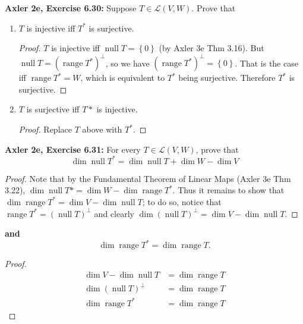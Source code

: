\documentclass{article}
\newcommand{\set}[1]{\left\{ #1 \right\}}
\DeclareMathOperator{\range}{range}
\DeclareMathOperator{\nulle}{null}
\begin{document}
\newpage %


\textbf{Axler 2e, Exercise 6.30: } %
Suppose $T \in \mathcal{L}(V, W)$. Prove that

\begin{enumerate}
    \item 
    $T$ is injective iff $T^*$ is surjective.
    \begin{proof}
        $T$ is injective iff $\nulle T = \set{0}$ (by Axler 3e Thm 3.16). But $\nulle T = (\range T^*)^\perp$, so we have $(\range T^*)^\perp = \set{0}$. That is the case iff $\range T^* = W$, which is equivalent to $T^*$ being surjective.
        Therefore $T^*$ is surjective.
    \end{proof}


    \item 
    $T$ is surjective iff $T*$ is injective.
    \begin{proof}
        Replace $T$ above with $T^*$.        
    \end{proof}
\end{enumerate}


\newpage %


\textbf{Axler 2e, Exercise 6.31: }
For every $T \in \mathcal{L}(V, W)$, prove that
$$\dim \nulle T^* = \dim \nulle T + \dim W - \dim V$$
\begin{proof}
    Note that by the Fundamental Theorem of Linear Maps (Axler 3e Thm 3.22), $\dim \nulle T* = \dim W - \dim \range T^*$. Thus it remains to show that $\dim \range T^* = \dim V - \dim \nulle T$; to do so, notice that $\range T^* = (\nulle T)^\perp$ and clearly $\dim (\nulle T)^\perp = \dim V - \dim \nulle T$.
\end{proof}

\textbf{and}
$$\dim \range T^* = \dim \range T.$$
\begin{proof}
    \begin{align*}
        \dim V - \dim \nulle T &= \dim \range T \\
        \dim (\nulle T)^\perp &= \dim \range T \\
        \dim \range T^* &= \dim \range T
    \end{align*}    
\end{proof}
\end{document}
